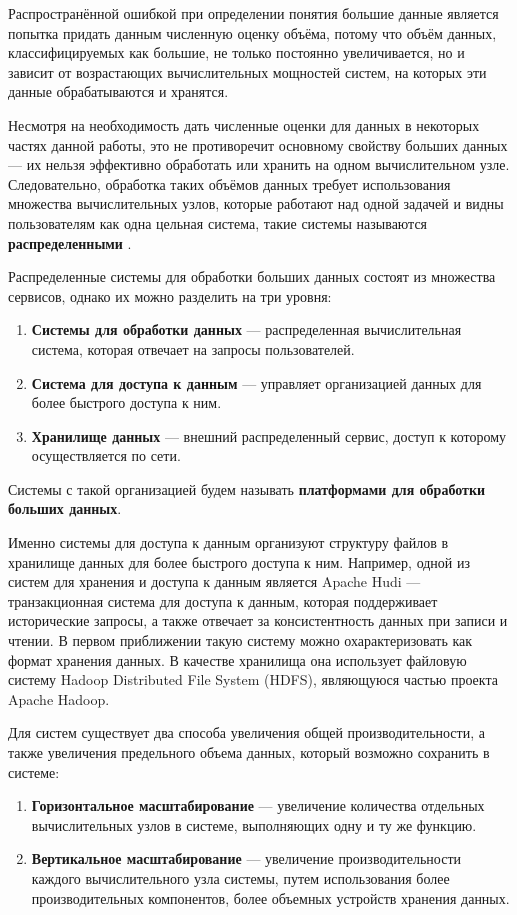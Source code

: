 Распространённой ошибкой при определении понятия большие данные является попытка придать данным численную оценку объёма, потому что объём данных, классифицируемых как большие, не только постоянно увеличивается, но и зависит от возрастающих вычислительных мощностей систем, на которых эти данные обрабатываются и хранятся. 

Несмотря на необходимость дать численные оценки для данных в некоторых частях данной работы, это не противоречит основному свойству больших данных --- их нельзя эффективно обработать или хранить на одном вычислительном узле. Следовательно, обработка таких объёмов данных требует использования множества вычислительных узлов, которые работают над одной задачей и видны пользователям как одна цельная система, такие системы называются \textbf{распределенными} \cite{Time_clocks_and_the_ordering_of_events_in_a_distributed_system}.

Распределенные системы для обработки больших данных состоят из множества сервисов, однако их можно разделить на три уровня: \cite{Spatial_big_data_architecture}
\begin{enumerate}
    \item \textbf{Системы для обработки данных} --- распределенная вычислительная система, которая отвечает на запросы пользователей.
    \item \textbf{Система для доступа к данным} --- управляет организацией данных для более быстрого доступа к ним.
    \item \textbf{Хранилище данных} --- внешний распределенный сервис, доступ к которому осуществляется по сети.
\end{enumerate}
Системы с такой организацией будем называть \textbf{платформами для обработки больших данных}.

Именно системы для доступа к данным организуют структуру файлов в хранилище данных для более быстрого доступа к ним. Например, одной из систем для хранения и доступа к данным является Apache Hudi --- транзакционная система для доступа к данным, которая поддерживает исторические запросы, а также отвечает за консистентность данных при записи и чтении. В первом приближении такую систему можно охарактеризовать как формат хранения данных. В качестве хранилища она использует файловую систему Hadoop Distributed File System (HDFS), являющуюся частью проекта Apache Hadoop. 

Для систем существует два способа увеличения общей производительности, а также увеличения предельного объема данных, который возможно сохранить в системе: \cite{Advanced_computer_architecture_and_parallel_processing}
\begin{enumerate}
    \item \textbf{Горизонтальное масштабирование} ---  увеличение количества отдельных вычислительных узлов в системе, выполняющих одну и ту же функцию.
    \item \textbf{Вертикальное масштабирование} --- увеличение производительности каждого вычислительного узла системы, путем использования более производительных компонентов, более объемных устройств хранения данных.
\end{enumerate}


